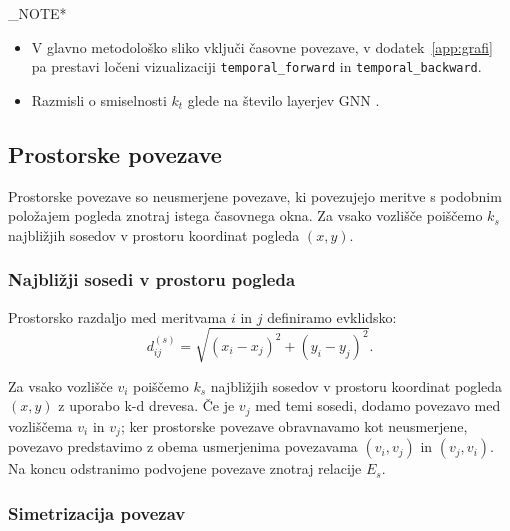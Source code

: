 \END_NOTE*{
    \begin{itemize}
        \item V glavno metodološko sliko vključi časovne povezave, v dodatek~\ref{app:grafi} pa prestavi ločeni vizualizaciji \texttt{temporal\_forward} in \texttt{temporal\_backward}.
        \item Razmisli o smiselnosti $k_t$ glede na število layerjev GNN .
    \end{itemize}
}


\subsection{Prostorske povezave}
\label{subsec:prostorske-povezave}

Prostorske povezave so neusmerjene povezave, ki povezujejo meritve s podobnim položajem pogleda znotraj istega časovnega okna.
Za vsako vozlišče poiščemo $k_s$ najbližjih sosedov v prostoru koordinat pogleda $(x,y)$.


\subsubsection{Najbližji sosedi v prostoru pogleda}

Prostorsko razdaljo med meritvama $i$ in $j$ definiramo evklidsko:
\begin{equation}
    d_{ij}^{(s)} =
    \sqrt{(x_i - x_j)^2 + (y_i - y_j)^2}.
\end{equation}

Za vsako vozlišče $v_i$ poiščemo $k_s$ najbližjih sosedov v prostoru koordinat pogleda $(x,y)$ z uporabo k-d drevesa. Če je $v_j$ med temi sosedi, dodamo povezavo med vozliščema $v_i$ in $v_j$; ker prostorske povezave obravnavamo kot neusmerjene, povezavo predstavimo z obema usmerjenima povezavama $(v_i,v_j)$ in $(v_j,v_i)$. Na koncu odstranimo podvojene povezave znotraj relacije $E_s$.

\subsubsection{Simetrizacija povezav}

